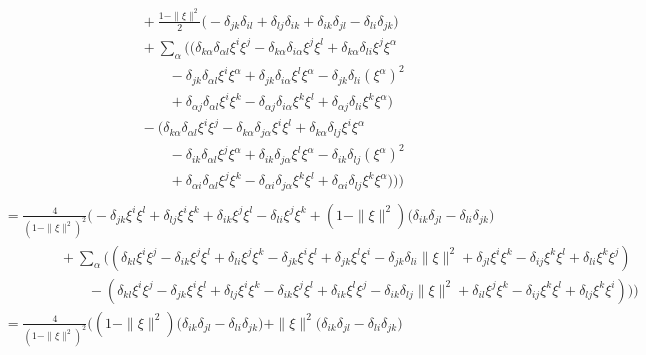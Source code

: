 \begin{Loes}
\begin{enumerate}[label=\alph*), widest=b, leftmargin=*]
\begin{align*}
		&\qquad\qquad + \tfrac{1-\|\xi\|^2}{2}\big( - \delta_{jk} \delta_{il}+\delta_{lj}\delta_{ik}+\delta_{ik}\delta_{jl}-\delta_{li}\delta_{jk}\big)\\
		&\qquad \qquad + \sum_\alpha \big( ( \delta_{k\alpha} \delta_{\alpha l} \xi^i \xi^j-\delta_{k\alpha} \delta_{i \alpha}  \xi^j\xi^l+\delta_{k\alpha} \delta_{li} \xi^j \xi^\alpha\\
		&\qquad \qquad \qquad -\delta_{jk}\delta_{\alpha l} \xi^i\xi^{\alpha}+\delta_{jk}\delta_{i \alpha}\xi^l\xi^{\alpha} -\delta_{jk}\delta_{li}(\xi^{\alpha})^2\\
		&\qquad \qquad \qquad+ \delta_{\alpha j}\delta_{\alpha l} \xi^i \xi^k - \delta_{\alpha j}\delta_{i \alpha}\xi^k \xi^l + \delta_{\alpha j} \delta_{li}   \xi^k \xi^\alpha)\\
		& \qquad \qquad - (  \delta_{k\alpha} \delta_{\alpha l} \xi^i \xi^j-\delta_{k\alpha} \delta_{j \alpha}  \xi^i\xi^l+\delta_{k\alpha} \delta_{lj} \xi^i \xi^\alpha\\
		&\qquad \qquad \qquad -\delta_{ik}\delta_{\alpha l} \xi^j\xi^{\alpha}+\delta_{ik}\delta_{j \alpha}\xi^l\xi^{\alpha} -\delta_{ik}\delta_{lj}(\xi^{\alpha})^2\\
		&\qquad \qquad \qquad+ \delta_{\alpha i}\delta_{\alpha l} \xi^j \xi^k - \delta_{\alpha i}\delta_{j \alpha}\xi^k \xi^l + \delta_{\alpha i} \delta_{lj}  \xi^k \xi^\alpha)\big)\Big)\\
	\end{align*}
	\begin{align*}
		&= \tfrac{4}{(1-\|\xi\|^2)^2}\Big(- \delta_{jk}\xi^i \xi^l + \delta_{lj}\xi^i\xi^k+ \delta_{ik}\xi^j \xi^l - \delta_{li}\xi^j\xi^k + (1-\|\xi\|^2)\big(\delta_{ik}\delta_{jl}-\delta_{li}\delta_{jk}\big)\\
		&\qquad \qquad + \sum_\alpha \big( ( \delta_{k l} \xi^i \xi^j- \delta_{i k}  \xi^j\xi^l+ \delta_{li} \xi^j \xi^k -\delta_{jk} \xi^i\xi^{l}+\delta_{jk}\xi^l\xi^{i} -\delta_{jk}\delta_{li}\|\xi\|^2+ \delta_{j l} \xi^i \xi^k - \delta_{i j}\xi^k \xi^l + \delta_{li} \xi^k \xi^j)\\
		&\qquad \qquad \qquad - (  \delta_{k l} \xi^i \xi^j- \delta_{j k}  \xi^i\xi^l+ \delta_{lj} \xi^i \xi^k -\delta_{ik} \xi^j\xi^{l}+\delta_{ik}\xi^l\xi^{j} -\delta_{ik}\delta_{lj}\|\xi\|^2 + \delta_{i l} \xi^j \xi^k - \delta_{ij}\xi^k \xi^l + \delta_{lj} \xi^k \xi^i)\big)\Big)\\
		&=  \tfrac{4}{(1-\|\xi\|^2)^2}\Big( (1-\|\xi\|^2)\big(\delta_{ik}\delta_{jl}-\delta_{li}\delta_{jk}\big) +  \|\xi\|^2 \big(\delta_{ik}\delta_{jl}-\delta_{li}\delta_{jk}\big)\\

\end{align*}
\end{enumerate}
\end{Loes}
